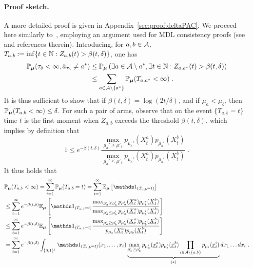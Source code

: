 \documentclass{colt2016} %
\begin{document}
\paragraph{Proof sketch.} A more detailed proof is given in Appendix~\ref{sec:proof:deltaPAC}. We proceed here similarly to~\cite{Rajesh15Oddball}, employing an argument used for MDL consistency proofs (see~\cite{G06} and references therein).
Introducing, for $a,b\in\mathcal{A}$, $T_{a,b} := \inf\{ t\in \mathbb{N} : Z_{a,b}(t) > \beta(t,\delta)\}$, one has 
\begin{align*}
\mathbb{P}_{\bm \mu}(\tau_\delta<\infty,\hat{a}_{\tau_\delta}\neq a^*) & \leq \mathbb{P}_{\bm \mu}\left(\exists a \in \mathcal{A}\setminus a^*, \exists t \in \mathbb{N} : Z_{a,a^*}(t) > \beta(t,\delta)\right) \\ &\leq \sum_{a\in \mathcal{A}\setminus \{a^*\}} \mathbb{P}_{\bm \mu}(T_{a,a^*} < \infty)\;.
\end{align*}
It is thus sufficient to show that if $\beta(t,\delta)=\log(2t/\delta)$, and if $\mu_a<\mu_b$, then $\mathbb{P}_{\bm \mu}(T_{a,b} < \infty) \leq \delta$.
For such a pair of arms, observe that on the event $\big\{T_{a,b}=t\big\}$ time $t$ is the first moment when $Z_{a,b}$ exceeds the threshold $\beta(t,\delta)$, which implies by definition that  
\[1 \leq e^{-\beta(t,\delta)} \frac{\max_{{\mu}_a' \geq {\mu}'_b} p_{\mu_a'}(\underline{X}^a_t)p_{\mu_b'}(\underline{X}^b_t)}{\max_{{\mu}_a' \leq {\mu}'_b} p_{\mu_a'}(\underline{X}^a_t)p_{\mu_b'}(\underline{X}^b_t)}\;.\]
It thus holds that
 \begin{align*}
 &\bP_{\bm \mu}(T_{a,b}< \infty)  = \sum_{t=1}^\infty \bP_{\bm \mu}(T_{a,b}=t) = \sum_{t=1}^\infty \bE_{\bm \mu}\left[\ind_{(T_{a,b}=t)}\right] \\
 & \leq \sum_{t=1}^\infty e^{-\beta(t,\delta)}\bE_{\bm \mu}\left[\ind_{(T_{a,b}=t)} \frac{\max_{{\mu}_a' \geq {\mu}'_b} p_{\mu_a'}(\underline{X}^a_t)p_{\mu_b'}(\underline{X}^b_t)}{\max_{ {\mu}_a' \leq {\mu}'_b} p_{\mu_a'}(\underline{X}^a_t)p_{\mu_b'}(\underline{X}^b_t)}\right] \\
 & \leq \sum_{t=1}^\infty e^{-\beta(t,\delta)}\bE_{\bm \mu}\left[\ind_{(T_{a,b}=t)} \frac{\max_{{\mu}_a' \geq {\mu}'_b} p_{\mu_a'}(\underline{X}^a_t)p_{\mu_b'}(\underline{X}^b_t)}{p_{\mu_a}(\underline{X}^a_t)p_{\mu_b}(\underline{X}^b_t)}\right] \\
 & =  \sum_{t=1}^\infty e^{-\beta(t,\delta)}\int_{\{0,1\}^t}\ind_{(T_{a,b}=t)}(x_1,\dots,x_t) \underbrace{ \max_{{\mu}_a' \geq {\mu}'_b} p_{\mu_a'}(\underline{x}^a_t)p_{\mu_b'}(\underline{x}^b_t)\prod_{i \in \Arms \setminus\{a,b\}} p_{\mu_i}(\underline{x}_t^i)}_{(*)}dx_1\dots dx_t \;.
\end{align*}
\end{document}
